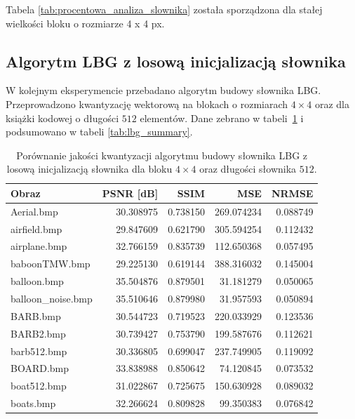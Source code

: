 \documentclass{article}
\begin{document}
Tabela \ref{tab:procentowa_analiza_slownika} została sporządzona dla stałej wielkości bloku o rozmiarze 4 x 4 px.

\subsection{Algorytm LBG z losową inicjalizacją słownika}
\label{sec:lbg_psnr}

W kolejnym eksperymencie przebadano algorytm budowy słownika LBG. Przeprowadzono kwantyzację wektorową na blokach o rozmiarach $4 \times 4$ oraz dla książki
kodowej o długości $512$ elementów. Dane zebrano w \mbox{tabeli \ref{tab:lbg_random}} i podsumowano w tabeli \mbox{\ref{tab:lbg_summary}}.

\begin{table}[!ht]
  \caption{Porównanie jakości kwantyzacji algorytmu budowy słownika LBG z losową inicjalizacją słownika dla bloku $4 \times 4$ oraz długości słownika $512$.}
  \label{tab:lbg_random}
  \centering
  \begin{tabular}{@{}lrrrr@{}}
    \toprule
    Obraz              & PSNR {[}dB{]} & SSIM     & MSE        & NRMSE    \\ \midrule
    Aerial.bmp         & 30.308975     & 0.738150 & 269.074234 & 0.088749 \\
    airfield.bmp       & 29.847609     & 0.621790 & 305.594254 & 0.112432 \\
    airplane.bmp       & 32.766159     & 0.835739 & 112.650368 & 0.057495 \\
    baboonTMW.bmp      & 29.225130     & 0.619144 & 388.316032 & 0.145004 \\
    balloon.bmp        & 35.504876     & 0.879501 & 31.181279  & 0.050065 \\
    balloon\_noise.bmp & 35.510646     & 0.879980 & 31.957593  & 0.050894 \\
    BARB.bmp           & 30.544723     & 0.719523 & 220.033929 & 0.123536 \\
    BARB2.bmp          & 30.739427     & 0.753790 & 199.587676 & 0.112621 \\
    barb512.bmp        & 30.336805     & 0.699047 & 237.749905 & 0.119092 \\
    BOARD.bmp          & 33.838988     & 0.850642 & 74.120845  & 0.073532 \\
    boat512.bmp        & 31.022867     & 0.725675 & 150.630928 & 0.089032 \\
    boats.bmp          & 32.266624     & 0.809828 & 99.350383  & 0.076842 \\

\end{tabular}
\end{table}
\end{document}
